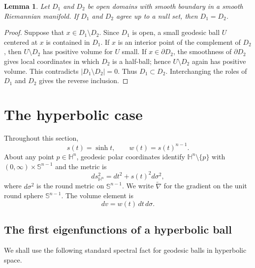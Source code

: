 \documentclass[10pt,a4paper]{amsart}
\newtheorem{lemma}[theorem]{Lemma}
\newcommand{\HH}{\mathbb H}
\newcommand{\Sn}{\mathbb S}
\begin{document}
\begin{lemma}\label{lem:ae-domain-equality}
Let $D_1$ and $D_2$ be open domains with smooth boundary in a smooth Riemannian manifold.  If $D_1$ and $D_2$ agree up to a null set, then $D_1=D_2$.
\end{lemma}

\begin{proof}
Suppose that $x\in D_1\setminus D_2$.  Since $D_1$ is open, a small geodesic ball $U$ centered at $x$ is contained in $D_1$.  If $x$ is an interior point of the complement of $D_2$, then $U\setminus D_2$ has positive volume for $U$ small.  If $x\in\partial D_2$, the smoothness of $\partial D_2$ gives local coordinates in which $D_2$ is a half-ball; hence $U\setminus D_2$ again has positive volume.  This contradicts $|D_1\setminus D_2|=0$.  Thus $D_1\subset D_2$.  Interchanging the roles of $D_1$ and $D_2$ gives the reverse inclusion.
\end{proof}

\section{The hyperbolic case}\label{sec3}

Throughout this section,
$$
        s(t)=\sinh t,
        \qquad
        w(t)=s(t)^{n-1}.
$$
About any point $p\in\HH^n$, geodesic polar coordinates identify $\HH^n\setminus\{p\}$ with $(0,\infty)\times\Sn^{n-1}$ and the metric is
\begin{equation}\label{eq:hyperbolic-polar-metric}
        ds_{\HH^n}^2=dt^2+s(t)^2d\sigma^2,
\end{equation}
where $d\sigma^2$ is the round metric on $\Sn^{n-1}$.  We write $\widetilde\nabla$ for the gradient on the unit round sphere $\Sn^{n-1}$.  The volume element is
$$
        dv=w(t)\,dt\,d\sigma.
$$

\subsection{The first eigenfunctions of a hyperbolic ball}

We shall use the following standard spectral fact for geodesic balls in hyperbolic space.
\end{document}
